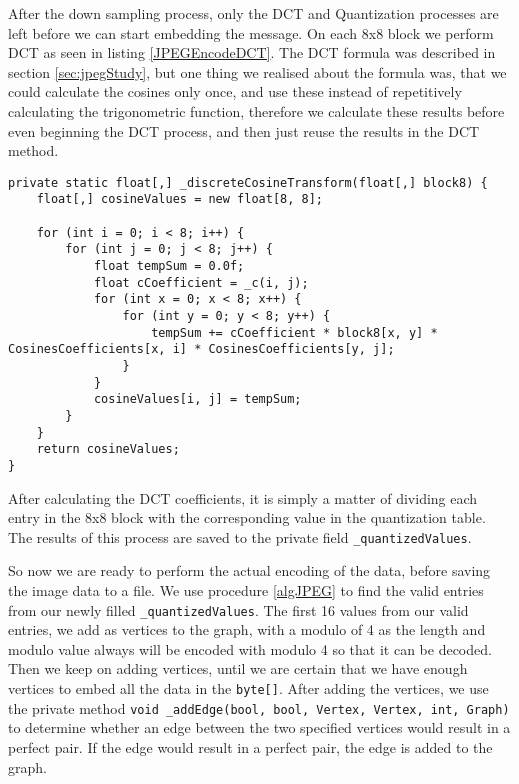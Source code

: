 After the down sampling process, only the DCT and Quantization processes are left before we can start embedding the message.
On each 8x8 block we perform DCT as seen in listing \ref{JPEGEncodeDCT}.
The DCT formula was described in section \ref{sec:jpegStudy}, but one thing we realised about the formula was, that we could calculate the cosines only once, and use these instead of repetitively calculating the trigonometric function, therefore we calculate these results before even beginning the DCT process, and then just reuse the results in the DCT method.
 

\begin{lstlisting}[firstnumber=603,label=JPEGEncodeDCT]
private static float[,] _discreteCosineTransform(float[,] block8) {
    float[,] cosineValues = new float[8, 8];

    for (int i = 0; i < 8; i++) {
        for (int j = 0; j < 8; j++) {
            float tempSum = 0.0f;
            float cCoefficient = _c(i, j);
            for (int x = 0; x < 8; x++) {
                for (int y = 0; y < 8; y++) {
                    tempSum += cCoefficient * block8[x, y] * CosinesCoefficients[x, i] * CosinesCoefficients[y, j];
                }
            }
            cosineValues[i, j] = tempSum;
        }
    }
    return cosineValues;
}
\end{lstlisting}

After calculating the DCT coefficients, it is simply a matter of dividing each entry in the 8x8 block with the corresponding value in the quantization table.
The results of this process are saved to the private field \lstinline|_quantizedValues|.

So now we are ready to perform the actual encoding of the data, before saving the image data to a file.
We use procedure \ref{algJPEG} to find the valid entries from our newly filled \lstinline|_quantizedValues|.
The first 16 values from our valid entries, we add as vertices to the graph, with a modulo of 4 as the length and modulo value always will be encoded with modulo 4 so that it can be decoded.
Then we keep on adding vertices, until we are certain that we have enough vertices to embed all the data in the \lstinline|byte[]|.
After adding the vertices, we use the private method \lstinline|void _addEdge(bool, bool, Vertex, Vertex, int, Graph)| to determine whether an edge between the two specified vertices would result in a perfect pair.
If the edge would result in a perfect pair, the edge is added to the graph.

